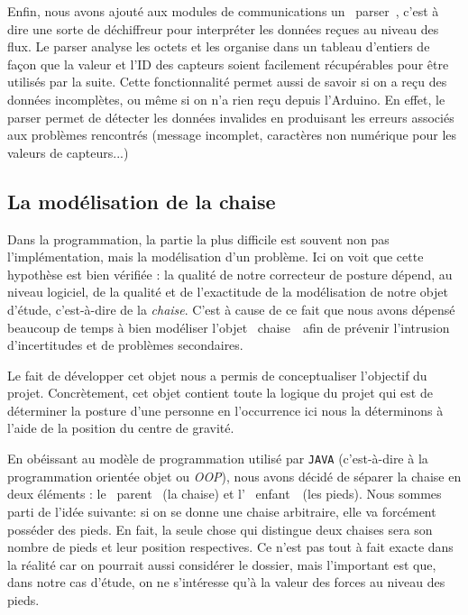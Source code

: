 \documentclass{polytech/polytech}
\begin{document}
Enfin, nous avons ajouté aux modules de communications un \guillemotleft ~parser~\guillemotright , c'est à dire une sorte de déchiffreur pour interpréter les données reçues au niveau des flux.
 Le parser analyse les octets et les organise dans un tableau d'entiers de façon que la valeur et l'ID des capteurs soient facilement récupérables pour être utilisés par la suite.
Cette fonctionnalité permet aussi de savoir si on a reçu des données incomplètes, ou même si on n'a rien reçu depuis l'Arduino. En effet, le parser permet de détecter les données invalides en produisant les erreurs associés aux problèmes rencontrés (message incomplet, caractères non numérique pour les valeurs de capteurs...)


\subsection{La modélisation de la chaise}
\label{subsec:model_chaise}
Dans la programmation, la partie la plus difficile est souvent non pas l'implémentation, mais la modélisation d'un problème. Ici on voit que cette hypothèse est bien vérifiée : la qualité de notre correcteur de posture dépend, au niveau logiciel, de la qualité et de l'exactitude de la modélisation de notre objet d'étude, c'est-à-dire de la \textit{chaise}. C'est à cause de ce fait que nous avons dépensé beaucoup de temps à bien modéliser l'objet \guillemotleft ~chaise~\guillemotright\ afin de prévenir l'intrusion d'incertitudes et de problèmes secondaires.

Le fait de développer cet objet nous a permis de conceptualiser l'objectif du projet. Concrètement, cet objet contient toute la logique du projet qui est de déterminer la posture d'une personne en l'occurrence ici nous la déterminons à l'aide de la position du centre de gravité.

En obéissant au modèle de programmation utilisé par \texttt{JAVA} (c'est-à-dire à la programmation orientée objet ou \textit{OOP}), nous avons décidé de séparer la chaise en deux éléments : le \guillemotleft ~parent \guillemotright\ (la chaise) et l' \guillemotleft\ enfant~\guillemotright\ (les pieds).
Nous sommes parti de l'idée suivante: si on se donne une chaise arbitraire, elle va forcément posséder des pieds. En fait, la seule chose qui distingue deux chaises sera son nombre de pieds et leur position respectives. Ce n'est pas tout à fait exacte dans la réalité car on pourrait aussi considérer le dossier, mais l'important est que, dans notre cas d'étude, on ne s'intéresse qu'à la valeur des forces au niveau des pieds.
\end{document}
